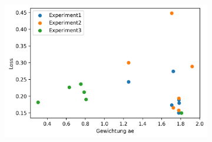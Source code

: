 \begin{figure}[h]
\begin{subfigure}[c]{0.31\textwidth}
		\includegraphics[width=1\textwidth, center]{bilder/Hauptteil/Step4_Data/Auto_Loss_Gewichtung_Ae.png}
	\end{subfigure}
	\label{img:AutoMlGewichtungAcc}
	\end{figure} 
	
